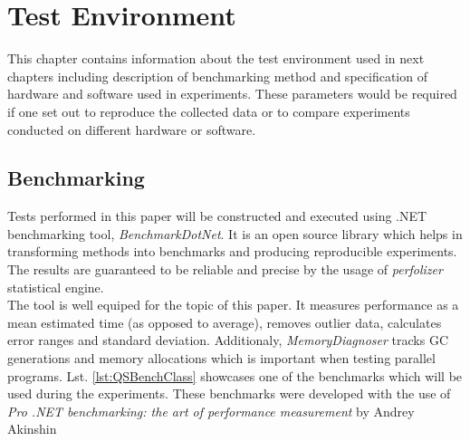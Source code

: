 \chapter{Test Environment} 

This chapter contains information about the test environment used in next chapters including description of benchmarking method and specification of hardware and software used in experiments. These parameters would be required if one set out to reproduce the collected data or to compare experiments conducted on different hardware or software.

\section{Benchmarking}
Tests performed in this paper will be constructed and executed using .NET benchmarking tool, \emph{BenchmarkDotNet}. It is an open source library which helps in transforming methods into benchmarks and producing reproducible experiments. The results are guaranteed to be reliable and precise by the usage of \emph{perfolizer} statistical engine. \\ 

The tool is well equiped for the topic of this paper. It measures performance as a mean estimated time (as opposed to average), removes outlier data, calculates error ranges and standard deviation. Additionaly, \emph{MemoryDiagnoser} tracks GC generations and memory allocations which is important when testing parallel programs. Lst. \ref{lst:QSBenchClass} showcases one of the benchmarks which will be used during the experiments.
These benchmarks were developed with the use of \emph{Pro .NET benchmarking: the art of performance measurement} by Andrey Akinshin \cite{Akinshin2019}



